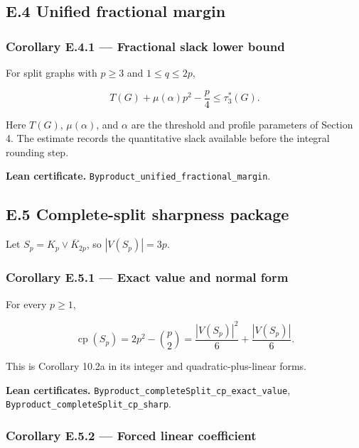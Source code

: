 \documentclass[
  american,
  11pt,
  a4paper,
]{article}
\begin{document}
\subsection{E.4 Unified fractional margin}\label{e.4-unified-fractional-margin}

\subsubsection{Corollary E.4.1 --- Fractional slack lower bound}\label{corollary-e.4.1-fractional-slack-lower-bound}

For split graphs with \(p\ge3\) and \(1\le q\le2p\),

\[
T(G)+\mu(\alpha)p^2-\frac p4
\le
\tau_3^*(G).
\]

Here \(T(G)\), \(\mu(\alpha)\), and \(\alpha\) are the threshold and profile parameters of Section 4. The estimate records the quantitative slack available before the integral rounding step.

\textbf{Lean certificate.} \texttt{Byproduct\_unified\_fractional\_margin}.

\subsection{E.5 Complete-split sharpness package}\label{e.5-complete-split-sharpness-package}

Let \(S_p=K_p\vee\overline K_{2p}\), so \(|V(S_p)|=3p\).

\subsubsection{Corollary E.5.1 --- Exact value and normal form}\label{corollary-e.5.1-exact-value-and-normal-form}

For every \(p\ge1\),

\[
\operatorname{cp}(S_p)
=2p^2-\binom p2
=\frac{|V(S_p)|^2}{6}+\frac{|V(S_p)|}{6}.
\]

This is Corollary 10.2a in its integer and quadratic-plus-linear forms.

\textbf{Lean certificates.} \texttt{Byproduct\_completeSplit\_cp\_exact\_value}, \texttt{Byproduct\_completeSplit\_cp\_sharp}.

\subsubsection{Corollary E.5.2 --- Forced linear coefficient}\label{corollary-e.5.2-forced-linear-coefficient}
\end{document}
